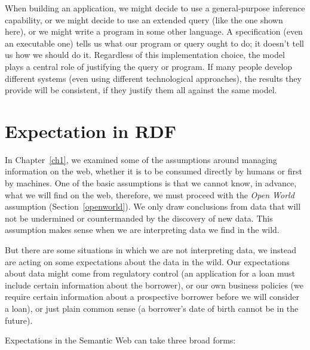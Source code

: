 When building an application, we might decide to use a general-purpose
inference capability, or we might decide to use an extended query (like
the one shown here), or we might write a program in some other language.
A specification (even an executable one) tells us what our program or
query ought to do; it doesn't tell us how we should do it. Regardless of
this implementation choice, the model plays a central role of justifying
the query or program. If many people develop different systems (even
using different technological approaches), the results they provide will
be consistent, if they justify them all against the same model.


\section{Expectation in RDF}


In Chapter~\ref{ch1}, we examined some of the assumptions around managing information on the web, 
whether it is to be consumed directly by humans or first by machines.  One of the basic assumptions is
that we cannot know, in advance, what we will find on the web, therefore, we must proceed with the \emph{Open World} assumption (Section~\ref{openworld}).  We only draw conclusions from data that will not be undermined or countermanded by the discovery of new data.  This assumption makes sense when we are interpreting data we find in the wild.

But there are some situations in which we are not interpreting data, we instead are acting on some expectations about the
data in the wild.  Our expectations about data might come from regulatory control (an application for a loan must
include certain information about the borrower), or our own business policies (we require certain information about a
prospective borrower before we will consider a loan), or just plain common sense (a borrower's date of birth cannot be in
the future).

Expectations in the Semantic Web can take three broad forms:

